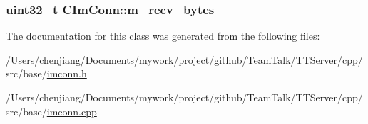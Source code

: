 \subsubsection[{m\+\_\+recv\+\_\+bytes}]{\setlength{\rightskip}{0pt plus 5cm}uint32\+\_\+t C\+Im\+Conn\+::m\+\_\+recv\+\_\+bytes\hspace{0.3cm}{\ttfamily [protected]}}\label{class_c_im_conn_ab2db96a7b08a80552c7457c2d54ae942}


The documentation for this class was generated from the following files\+:\begin{DoxyCompactItemize}
\item 
/\+Users/chenjiang/\+Documents/mywork/project/github/\+Team\+Talk/\+T\+T\+Server/cpp/src/base/\hyperlink{imconn_8h}{imconn.\+h}\item 
/\+Users/chenjiang/\+Documents/mywork/project/github/\+Team\+Talk/\+T\+T\+Server/cpp/src/base/\hyperlink{imconn_8cpp}{imconn.\+cpp}\end{DoxyCompactItemize}
